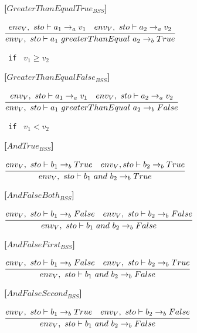 \textbf{[$GreaterThanEqualTrue_{BSS}$]}
\begin{center}
	\begin{math}
	\cfrac
	{env_V,\ sto \vdash a_1 \rightarrow_a v_1 \quad env_V,\ sto \vdash a_2 \rightarrow_a v_2}
	{env_V,\ sto \vdash a_1\ greaterThanEqual\ a_2 \rightarrow_b True}
	\end{math}
	
	\texttt{ if } $v_1 \geq v_2$
\end{center}

\textbf{[$GreaterThanEqualFalse_{BSS}$]}
\begin{center}
	\begin{math}
	\cfrac
	{env_V,\ sto \vdash a_1 \rightarrow_a v_1 \quad env_V,\ sto \vdash a_2 \rightarrow_a v_2}
	{env_V,\ sto \vdash a_1\ greaterThanEqual\ a_2 \rightarrow_b False}
	\end{math}
	
	\texttt{ if } $v_1 < v_2$
\end{center}

\textbf{[$AndTrue_{BSS}$]}
\begin{center}
	\begin{math}
	\cfrac
		{env_V,\ sto \vdash b_1 \rightarrow_b True \quad env_V, sto \vdash b_2 \rightarrow_b True}
		{env_V,\ sto \vdash b_1\ and\ b_2 \rightarrow_b True}
	\end{math}
\end{center}

\textbf{[$AndFalseBoth_{BSS}$]}
\begin{center}
	\begin{math}
	\cfrac
		{env_V,\ sto \vdash b_1 \rightarrow_b False \quad env_V,\ sto \vdash b_2 \rightarrow_b False}
		{env_V,\ sto \vdash b_1\ and\ b_2 \rightarrow_b False}
	\end{math}
\end{center}

\textbf{[$AndFalseFirst_{BSS}$]}
\begin{center}
	\begin{math}
	\cfrac
	{env_V,\ sto \vdash b_1 \rightarrow_b False \quad env_V,\ sto \vdash b_2 \rightarrow_b True}
	{env_V,\ sto \vdash b_1\ and\ b_2 \rightarrow_b False}
	\end{math}
\end{center}

\textbf{[$AndFalseSecond_{BSS}$]}
\begin{center}
	\begin{math}
	\cfrac
	{env_V,\ sto \vdash b_1 \rightarrow_b True \quad env_V,\ sto \vdash b_2 \rightarrow_b False}
	{env_V,\ sto \vdash b_1\ and\ b_2 \rightarrow_b False}
	\end{math}
\end{center}

